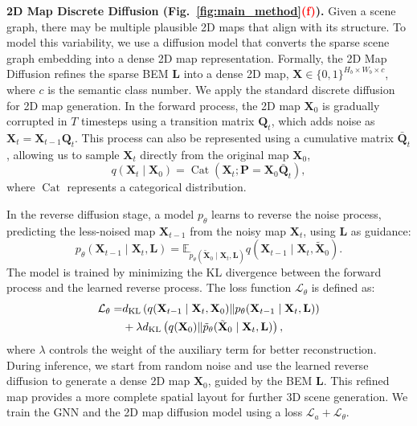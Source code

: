 \noindent \textbf{2D Map Discrete Diffusion (Fig.~\ref{fig:main_method}\textcolor{red}{(f)}).} Given a scene graph, there may be multiple plausible 2D maps that align with its structure. To model this variability, we use a diffusion model that converts the sparse scene graph embedding into a dense 2D map representation.
%
Formally, the 2D Map Diffusion refines the sparse BEM $\mathbf{L}$ into a dense 2D map,  $\mathbf{X} \in \{0, 1\}^{H_b \times W_b \times c}$, where \( c \) is the semantic class number. We apply the standard discrete diffusion~\cite{austin2021structured} for 2D map generation.  
%
In the forward process, the 2D map \( \mathbf{X}_0 \) is gradually corrupted in \( T \) timesteps using a transition matrix \( \mathbf{Q}_t \), which adds noise as $\mathbf{X}_t = \mathbf{X}_{t-1} \mathbf{Q}_t$. 
%
This process can also be represented using a cumulative matrix \( \bar{\mathbf{Q}}_t \), allowing us to sample \( \mathbf{X}_t \) directly from the original map \( \mathbf{X}_0 \), 
\small
\begin{equation}
   q(\mathbf{X}_t \mid \mathbf{X}_0) = \operatorname{Cat}(\mathbf{X}_t; \mathbf{P} = \mathbf{X}_0 \bar{\mathbf{Q}}_t),
\end{equation}
\normalsize
where \( \operatorname{Cat} \) represents a categorical distribution.

In the reverse diffusion stage, a model \( p_\theta \) learns to reverse the noise process, predicting the less-noised map \( \mathbf{X}_{t-1} \) from the noisy map \( \mathbf{X}_t \), using \( \mathbf{L} \) as guidance:
\small
\begin{equation}
   p_\theta(\mathbf{X}_{t-1} \mid \mathbf{X}_t, \mathbf{L}) = \mathbb{E}_{\tilde{p}_\theta(\tilde{\mathbf{X}}_0 \mid \mathbf{X}_t, \mathbf{L})} q(\mathbf{X}_{t-1} \mid \mathbf{X}_t, \tilde{\mathbf{X}}_0).
\end{equation}
\normalsize
The model is trained by minimizing the KL divergence between the forward process and the learned reverse process. The loss function \( \mathcal{L}_\theta \) is defined as:
\small
\begin{align}\label{eq:diff_loss}
   \mathcal{L}_\theta =   & d_{\text{KL}}\left(q(\mathbf{X}_{t-1} \mid \mathbf{X}_t, \mathbf{X}_0) \| p_\theta(\mathbf{X}_{t-1} \mid \mathbf{X}_t, \mathbf{L})\right) \\\notag
   &+ \lambda d_{\text{KL}}\left(q(\mathbf{X}_0) \| \tilde{p}_\theta(\tilde{\mathbf{X}}_0 \mid \mathbf{X}_t, \mathbf{L})\right),
\end{align}
\normalsize
where \( \lambda \) controls the weight of the auxiliary term for better reconstruction. During inference, we start from random noise and use the learned reverse diffusion to generate a dense 2D map \( \mathbf{X}_0 \), guided by the BEM \( \mathbf{L} \). This refined map provides a more complete spatial layout for further 3D scene generation. We train the GNN and the 2D map diffusion model using a loss 
% 
$\mathcal{L}_a+\mathcal{L}_{\theta}$. 
%

